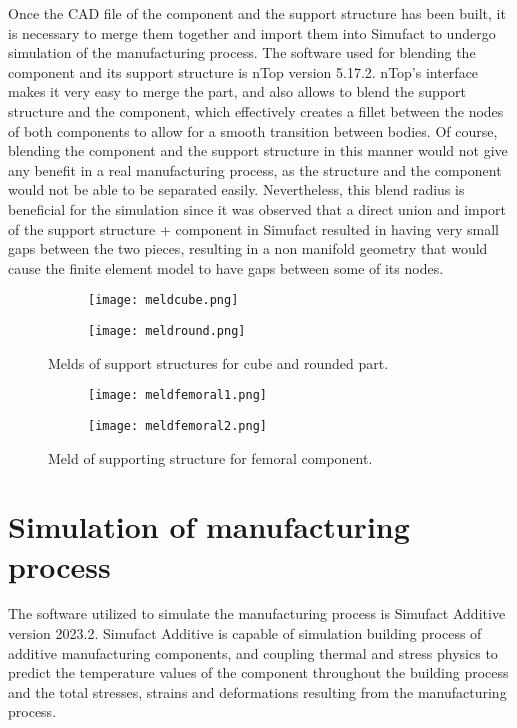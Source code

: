 \documentclass[../main.tex]{subfiles}
\begin{document}
Once the CAD file of the component and the support structure has been built, it is necessary to merge them together and import them into Simufact to undergo simulation of the manufacturing process. The software used for blending the component and its support structure is nTop version 5.17.2. nTop's interface makes it very easy to merge the part, and also allows to blend the support structure and the component, which effectively creates a fillet between the nodes of both components to allow for a smooth transition between bodies. Of course, blending the component and the support structure in this manner would not give any benefit in a real manufacturing process, as the structure and the component would not be able to be separated easily. Nevertheless, this blend radius is beneficial for the simulation since it was observed that a direct union and import of the support structure + component in Simufact resulted in having very small gaps between the two pieces, resulting in a non manifold geometry that would cause the finite element model to have gaps between some of its nodes.

\begin{figure}
  \begin{subfigure}{0.45\textwidth}
    \texttt{[image: meldcube.png]}
  \end{subfigure}
  \begin{subfigure}{0.45\textwidth}
      \texttt{[image: meldround.png]}
    \end{subfigure}
    \caption{Melds of support structures for cube and rounded part.}
  \end{figure}

\begin{figure}
  \begin{subfigure}{0.45\textwidth}
    \texttt{[image: meldfemoral1.png]}
  \end{subfigure}
  \begin{subfigure}{0.45\textwidth}
      \texttt{[image: meldfemoral2.png]}
    \end{subfigure}
  \caption{Meld of supporting structure for femoral component.}
\end{figure}

\section{Simulation of manufacturing process}

The software utilized to simulate the manufacturing process is Simufact Additive version 2023.2. Simufact Additive is capable of simulation building process of additive manufacturing components, and coupling thermal and stress physics to predict the temperature values of the component throughout the building process and the total stresses, strains and deformations resulting from the manufacturing process. 
\end{document}
